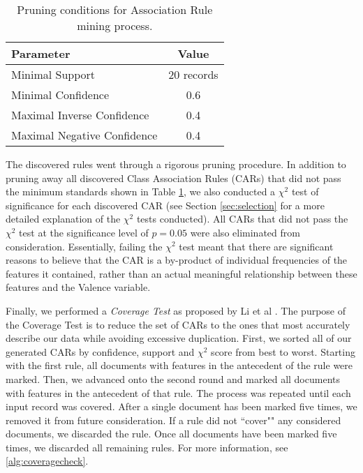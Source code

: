 \begin{table}
    \centering
    \begin{tabular}{|l|c|}
    \hline
    \textsf{Parameter} & \textsf{Value} \\
    \hline
    Minimal Support  &  20 records\\ 
    Minimal Confidence & 0.6 \\
    Maximal Inverse Confidence & 0.4\\
    Maximal Negative Confidence& 0.4\\
    \hline
    \end{tabular}
    \caption{Pruning conditions for Association Rule mining process.}
    \label{tab:AR}
\end{table} 
 

 
 
  The discovered rules went through a rigorous pruning procedure. In addition
  to pruning away all discovered Class Association Rules (CARs) that did not
  pass the minimum standards shown in Table \ref{tab:AR}, we also conducted
  a $\chi^2$ test of significance for each discovered CAR (see Section \ref{sec:selection}
  for a more detailed explanation of the $\chi^2$ tests conducted). All CARs
  that did not pass the $\chi^2$ test at the significance level of
  $p=0.05$ were also eliminated from consideration. Essentially, failing
  the $\chi^2$ test meant that there are significant reasons to believe that 
  the CAR is a by-product of individual frequencies of the features it contained,
  rather than an actual meaningful relationship between these features and
  the \textsf{Valence} variable.
  
Finally, we performed a \textit{Coverage Test} as proposed by Li et al \cite{cmar}. The purpose of the \textsf{Coverage Test} is to reduce the set of CARs to the ones that most accurately describe our data while avoiding excessive duplication. First, we sorted all of our generated CARs by confidence, support and $\chi^2$ score from best to worst. Starting with the first rule, all documents with features in the antecedent of the rule were marked. Then, we advanced onto the second round and marked all documents with features in the antecedent of that rule. The process was repeated until each input record was covered. After a single document has been marked five times, we removed it from future consideration. If a rule did not ``cover"" any considered documents, we discarded the rule. Once all documents have been marked five times, we discarded all remaining rules. For more information, see \ref{alg:coveragecheck}.
 
